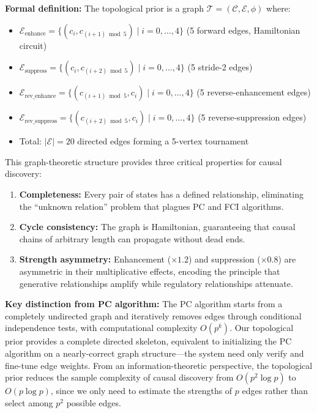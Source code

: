 \documentclass[11pt,a4paper]{article}
\begin{document}
\textbf{Formal definition:} The topological prior is a graph \(\mathcal{T} = (\mathcal{C}, \mathcal{E}, \phi)\) where:
\begin{itemize}[itemsep=0pt]
    \item \(\mathcal{E}_{\text{enhance}} = \{(c_i, c_{(i+1)\bmod 5}) \mid i = 0,\ldots,4\}\) (5 forward edges, Hamiltonian circuit)
    \item \(\mathcal{E}_{\text{suppress}} = \{(c_i, c_{(i+2)\bmod 5}) \mid i = 0,\ldots,4\}\) (5 stride-2 edges)
    \item \(\mathcal{E}_{\text{rev\_enhance}} = \{(c_{(i+1)\bmod 5}, c_i) \mid i = 0,\ldots,4\}\) (5 reverse-enhancement edges)
    \item \(\mathcal{E}_{\text{rev\_suppress}} = \{(c_{(i+2)\bmod 5}, c_i) \mid i = 0,\ldots,4\}\) (5 reverse-suppression edges)
    \item Total: \(|\mathcal{E}| = 20\) directed edges forming a 5-vertex tournament
\end{itemize}

This graph-theoretic structure provides three critical properties for causal discovery:

\begin{enumerate}[leftmargin=*,itemsep=2pt]
    \item \textbf{Completeness:} Every pair of states has a defined relationship, eliminating the ``unknown relation'' problem that plagues PC and FCI algorithms.
    \item \textbf{Cycle consistency:} The graph is Hamiltonian, guaranteeing that causal chains of arbitrary length can propagate without dead ends.
    \item \textbf{Strength asymmetry:} Enhancement (\(\times 1.2\)) and suppression (\(\times 0.8\)) are asymmetric in their multiplicative effects, encoding the principle that generative relationships amplify while regulatory relationships attenuate.
\end{enumerate}

\textbf{Key distinction from PC algorithm:} The PC algorithm starts from a completely undirected graph and iteratively removes edges through conditional independence tests, with computational complexity \(O(p^k)\). Our topological prior provides a complete directed skeleton, equivalent to initializing the PC algorithm on a nearly-correct graph structure---the system need only verify and fine-tune edge weights. From an information-theoretic perspective, the topological prior reduces the sample complexity of causal discovery from \(O(p^2 \log p)\) to \(O(p \log p)\), since we only need to estimate the strengths of \(p\) edges rather than select among \(p^2\) possible edges.
\end{document}
